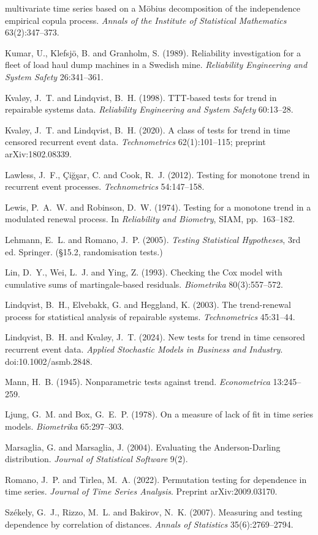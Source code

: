 \documentclass[11pt,a4paper]{article}
\begin{document}
\begin{description}[leftmargin=1.2em,labelindent=0em,itemsep=1pt,font=\normalfont]
multivariate time series based on a Möbius decomposition of the independence empirical
copula process. \emph{Annals of the Institute of Statistical Mathematics}
63(2):347--373.
\item Kumar, U., Klefsjö, B. and Granholm, S. (1989). Reliability investigation for a
fleet of load haul dump machines in a Swedish mine. \emph{Reliability Engineering and
System Safety} 26:341--361.
\item Kvaløy, J.~T. and Lindqvist, B.~H. (1998). TTT-based tests for trend in repairable
systems data. \emph{Reliability Engineering and System Safety} 60:13--28.
\item Kvaløy, J.~T. and Lindqvist, B.~H. (2020). A class of tests for trend in time
censored recurrent event data.
\emph{Technometrics} 62(1):101--115; preprint arXiv:1802.08339.
\item Lawless, J.~F., Çiğşar, C. and Cook, R.~J. (2012). Testing for monotone trend in
recurrent event processes. \emph{Technometrics} 54:147--158.
\item Lewis, P.~A.~W. and Robinson, D.~W. (1974). Testing for a monotone trend in a
modulated renewal process. In \emph{Reliability and Biometry}, SIAM, pp.~163--182.
\item Lehmann, E.~L. and Romano, J.~P. (2005). \emph{Testing Statistical Hypotheses},
3rd ed. Springer. (\S 15.2, randomisation tests.)
\item Lin, D.~Y., Wei, L.~J. and Ying, Z. (1993). Checking the Cox model with cumulative
sums of martingale-based residuals. \emph{Biometrika} 80(3):557--572.
\item Lindqvist, B.~H., Elvebakk, G. and Heggland, K. (2003). The trend-renewal process
for statistical analysis of repairable systems. \emph{Technometrics} 45:31--44.
\item Lindqvist, B.~H. and Kvaløy, J.~T. (2024). New tests for trend in time censored
recurrent event data. \emph{Applied Stochastic Models in Business and Industry}.
doi:10.1002/asmb.2848.
\item Mann, H.~B. (1945). Nonparametric tests against trend. \emph{Econometrica}
13:245--259.
\item Ljung, G.~M. and Box, G.~E.~P. (1978). On a measure of lack of fit in time series
models. \emph{Biometrika} 65:297--303.
\item Marsaglia, G. and Marsaglia, J. (2004). Evaluating the Anderson-Darling
distribution. \emph{Journal of Statistical Software} 9(2).
\item Romano, J.~P. and Tirlea, M.~A. (2022). Permutation testing for dependence in time
series. \emph{Journal of Time Series Analysis}. Preprint arXiv:2009.03170.
\item Székely, G.~J., Rizzo, M.~L. and Bakirov, N.~K. (2007). Measuring and testing
dependence by correlation of distances. \emph{Annals of Statistics} 35(6):2769--2794.
\end{description}
\end{document}
